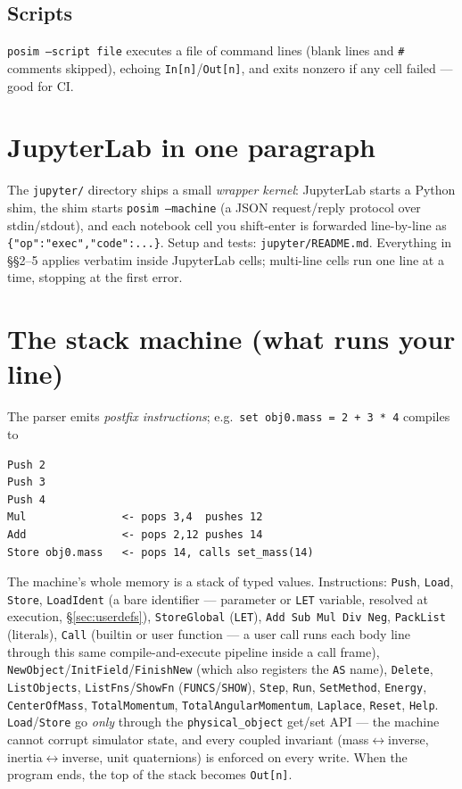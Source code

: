 \documentclass[11pt]{article}
\newcommand{\kw}[1]{\texttt{\uppercase{#1}}}
\newcommand{\code}[1]{\texttt{#1}}
\begin{document}
\subsection{Scripts}
\code{posim --script file} executes a file of command lines (blank lines
and \code{\#} comments skipped), echoing \code{In[n]}/\code{Out[n]}, and
exits nonzero if any cell failed --- good for CI.

\section{JupyterLab in one paragraph}\label{sec:jlab}

The \code{jupyter/} directory ships a small \emph{wrapper kernel}:
JupyterLab starts a Python shim, the shim starts \code{posim --machine}
(a JSON request/reply protocol over stdin/stdout), and each notebook
cell you shift-enter is forwarded line-by-line as
\code{\{"op":"exec","code":...\}}. Setup and tests:
\code{jupyter/README.md}. Everything in \S\S2--5 applies verbatim inside
JupyterLab cells; multi-line cells run one line at a time, stopping at
the first error.

\section{The stack machine (what runs your line)}

The parser emits \emph{postfix instructions}; e.g.\
\code{set obj0.mass = 2 + 3 * 4} compiles to
\begin{lstlisting}
Push 2
Push 3
Push 4
Mul               <- pops 3,4  pushes 12
Add               <- pops 2,12 pushes 14
Store obj0.mass   <- pops 14, calls set_mass(14)
\end{lstlisting}
The machine's whole memory is a stack of typed values. Instructions:
\code{Push}, \code{Load}, \code{Store}, \code{LoadIdent} (a bare
identifier --- parameter or \kw{let} variable, resolved at execution,
\S\ref{sec:userdefs}), \code{StoreGlobal} (\kw{let}),
\code{Add Sub Mul Div Neg},
\code{PackList} (literals), \code{Call} (builtin or user function ---
a user call runs each body line through this same compile-and-execute
pipeline inside a call frame),
\code{NewObject}/\code{InitField}/\code{FinishNew} (which also
registers the \kw{as} name), \code{Delete},
\code{ListObjects}, \code{ListFns}/\code{ShowFn}
(\kw{funcs}/\kw{show}), \code{Step}, \code{Run}, \code{SetMethod},
\code{Energy}, \code{CenterOfMass}, \code{TotalMomentum},
\code{TotalAngularMomentum}, \code{Laplace}, \code{Reset}, \code{Help}.
\code{Load}/\code{Store} go \emph{only} through the
\code{physical\_object} get/set API --- the machine cannot corrupt
simulator state, and every coupled invariant (mass$\leftrightarrow$inverse,
inertia$\leftrightarrow$inverse, unit quaternions) is enforced on every
write. When the program ends, the top of the stack becomes \code{Out[n]}.
\end{document}
